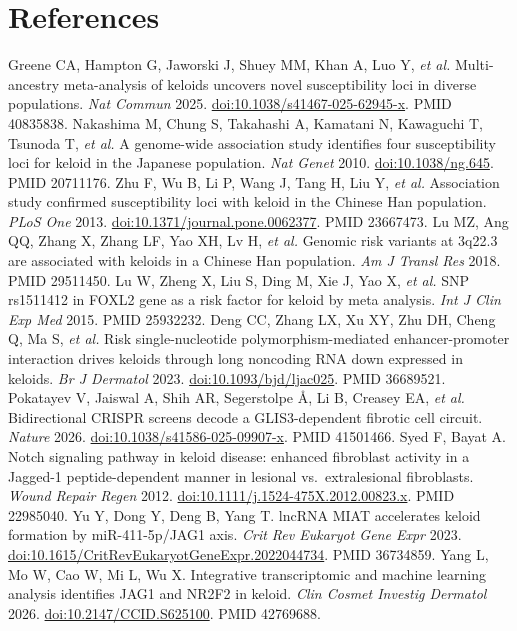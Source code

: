 \documentclass[10pt,twocolumn,a4paper]{article}
\makeatletter
\renewenvironment{thebibliography}[1]{\section*{References}\small\list{\@biblabel{\@arabic\c@enumiv}}{\settowidth\labelwidth{[99]}\leftmargin\labelwidth\advance\leftmargin\labelsep\setlength{\itemsep}{1.5pt}\setlength{\parsep}{0pt}\usecounter{enumiv}\renewcommand\theenumiv{\@arabic\c@enumiv}}\raggedright}{\endlist}
\makeatother
\begin{document}
\begin{thebibliography}{99}
 Greene CA, Hampton G, Jaworski J, Shuey MM, Khan A, Luo Y, \emph{et al.} Multi-ancestry meta-analysis of keloids uncovers novel susceptibility loci in diverse populations. \emph{Nat Commun} 2025. \href{https://doi.org/10.1038/s41467-025-62945-x}{doi:10.1038/s41467-025-62945-x}. PMID 40835838.
 Nakashima M, Chung S, Takahashi A, Kamatani N, Kawaguchi T, Tsunoda T, \emph{et al.} A genome-wide association study identifies four susceptibility loci for keloid in the Japanese population. \emph{Nat Genet} 2010. \href{https://doi.org/10.1038/ng.645}{doi:10.1038/ng.645}. PMID 20711176.
 Zhu F, Wu B, Li P, Wang J, Tang H, Liu Y, \emph{et al.} Association study confirmed susceptibility loci with keloid in the Chinese Han population. \emph{PLoS One} 2013. \href{https://doi.org/10.1371/journal.pone.0062377}{doi:10.1371/journal.pone.0062377}. PMID 23667473.
 Lu MZ, Ang QQ, Zhang X, Zhang LF, Yao XH, Lv H, \emph{et al.} Genomic risk variants at 3q22.3 are associated with keloids in a Chinese Han population. \emph{Am J Transl Res} 2018. PMID 29511450.
 Lu W, Zheng X, Liu S, Ding M, Xie J, Yao X, \emph{et al.} SNP rs1511412 in FOXL2 gene as a risk factor for keloid by meta analysis. \emph{Int J Clin Exp Med} 2015. PMID 25932232.
 Deng CC, Zhang LX, Xu XY, Zhu DH, Cheng Q, Ma S, \emph{et al.} Risk single-nucleotide polymorphism-mediated enhancer-promoter interaction drives keloids through long noncoding RNA down expressed in keloids. \emph{Br J Dermatol} 2023. \href{https://doi.org/10.1093/bjd/ljac025}{doi:10.1093/bjd/ljac025}. PMID 36689521.
 Pokatayev V, Jaiswal A, Shih AR, Segerstolpe Å, Li B, Creasey EA, \emph{et al.} Bidirectional CRISPR screens decode a GLIS3-dependent fibrotic cell circuit. \emph{Nature} 2026. \href{https://doi.org/10.1038/s41586-025-09907-x}{doi:10.1038/s41586-025-09907-x}. PMID 41501466.
 Syed F, Bayat A. Notch signaling pathway in keloid disease: enhanced fibroblast activity in a Jagged-1 peptide-dependent manner in lesional vs.~extralesional fibroblasts. \emph{Wound Repair Regen} 2012. \href{https://doi.org/10.1111/j.1524-475X.2012.00823.x}{doi:10.1111/j.1524-475X.2012.00823.x}. PMID 22985040.
 Yu Y, Dong Y, Deng B, Yang T. lncRNA MIAT accelerates keloid formation by miR-411-5p/JAG1 axis. \emph{Crit Rev Eukaryot Gene Expr} 2023. \href{https://doi.org/10.1615/CritRevEukaryotGeneExpr.2022044734}{doi:10.1615/CritRevEukaryotGeneExpr.2022044734}. PMID 36734859.
 Yang L, Mo W, Cao W, Mi L, Wu X. Integrative transcriptomic and machine learning analysis identifies JAG1 and NR2F2 in keloid. \emph{Clin Cosmet Investig Dermatol} 2026. \href{https://doi.org/10.2147/CCID.S625100}{doi:10.2147/CCID.S625100}. PMID 42769688.

\end{thebibliography}
\end{document}
